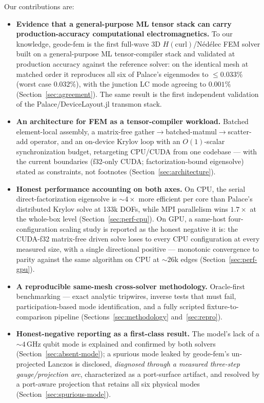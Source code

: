 \documentclass{anvil-paper}
\begin{document}
Our contributions are:
\begin{itemize}
  \item \textbf{Evidence that a general-purpose ML tensor stack can carry
    production-accuracy computational electromagnetics.} To our knowledge,
    geode-fem is the first full-wave 3D $H(\mathrm{curl})$/N\'ed\'elec FEM
    solver built on a general-purpose ML tensor-compiler stack and
    validated at production accuracy against the reference solver: on the
    identical mesh at matched order it reproduces all six of Palace's
    eigenmodes to $\leq 0.033\%$ (worst case $0.032\%$), with the junction
    LC mode agreeing to $0.001\%$ (Section~\ref{sec:agreement}). The same
    result is the first independent validation of the
    Palace/DeviceLayout.jl transmon stack.
  \item \textbf{An architecture for FEM as a tensor-compiler workload.}
    Batched element-local assembly, a matrix-free
    gather$\to$batched-matmul$\to$scatter-add operator, and an on-device
    Krylov loop with an $O(1)$-scalar synchronization budget, retargeting
    CPU/CUDA from one codebase --- with the current boundaries (f32-only
    CUDA; factorization-bound eigensolve) stated as constraints, not
    footnotes (Section~\ref{sec:architecture}).
  \item \textbf{Honest performance accounting on both axes.} On CPU, the
    serial direct-factorization eigensolve is ${\sim}4\times$ more
    efficient per core than Palace's distributed Krylov solve at 133k
    DOFs, while MPI parallelism wins $1.7\times$ at the whole-box level
    (Section~\ref{sec:perf-cpu}). On GPU, a same-host four-configuration
    scaling study is reported as the honest negative it is: the CUDA-f32
    matrix-free driven solve loses to every CPU configuration at every
    measured size, with a single directional positive --- monotonic
    convergence to parity against the same algorithm on CPU at ${\sim}26$k
    edges (Section~\ref{sec:perf-gpu}).
  \item \textbf{A reproducible same-mesh cross-solver methodology.}
    Oracle-first benchmarking --- exact analytic tripwires, inverse tests
    that must fail, participation-based mode identification, and a fully
    scripted fixture-to-comparison pipeline
    (Sections~\ref{sec:methodology} and~\ref{sec:repro}).
  \item \textbf{Honest-negative reporting as a first-class result.} The
    model's lack of a ${\sim}4$\,GHz qubit mode is explained and confirmed
    by both solvers (Section~\ref{sec:absent-mode}); a spurious mode
    leaked by geode-fem's un-projected Lanczos is disclosed,
    \emph{diagnosed through a measured three-step gauge/projection arc},
    characterized as a port-surface artifact, and resolved by a port-aware
    projection that retains all six physical modes
    (Section~\ref{sec:spurious-mode}).
\end{itemize}
\end{document}
